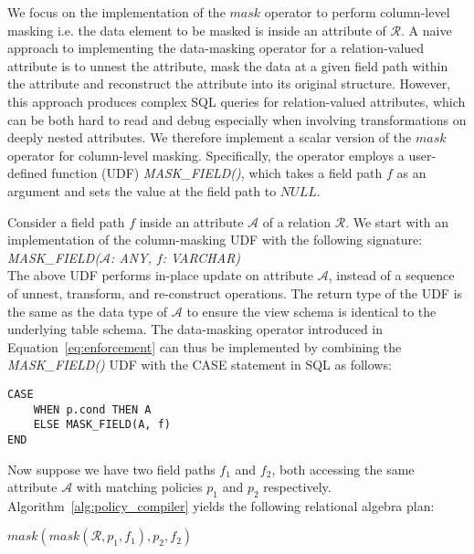 We focus on the implementation of the $mask$ operator to perform column-level masking i.e. the data element to be masked is inside an attribute of $\mathcal{R}$. A naive approach to implementing the data-masking operator for a relation-valued attribute is to unnest the attribute, mask the data at a given field path within the attribute and reconstruct the attribute into its original structure. 
However, this approach produces complex SQL queries for relation-valued attributes, which can be both hard to read and debug especially when involving transformations on deeply nested attributes. 
We therefore implement a scalar version of the $mask$ operator for column-level masking. Specifically, the operator employs a user-defined function (UDF) \emph{MASK\_FIELD()}, which takes a field path $f$ as an argument and sets the value at the field path to $NULL$. 

Consider a field path $f$ inside an attribute $\mathcal{A}$ of a relation $\mathcal{R}$. We start with an implementation of the column-masking UDF with the following signature: \\
\emph{MASK\_FIELD($\mathcal{A}$: ANY, $f$: VARCHAR)} \\
The above UDF performs in-place update on attribute $\mathcal{A}$, instead of a sequence of unnest, transform, 
and re-construct operations. The return type of the UDF is the same as the data type of $\mathcal{A}$ to ensure the view schema is identical to the underlying table schema.
The data-masking operator introduced in Equation~\ref{eq:enforcement} can thus be implemented by combining the \emph{MASK\_FIELD()} UDF with the CASE statement in SQL as follows: 
\begin{lstlisting} 
CASE
    WHEN p.cond THEN A 
    ELSE MASK_FIELD(A, f)
END
\end{lstlisting}

Now suppose we have two field paths $f_1$ and $f_2$, both accessing the same attribute $\mathcal{A}$ with matching policies $p_1$ and $p_2$ respectively.  Algorithm~\ref{alg:policy_compiler} yields the following  
relational algebra plan:

$mask(mask(\mathcal{R}, p_1, f_1), p_2, f_2)$

